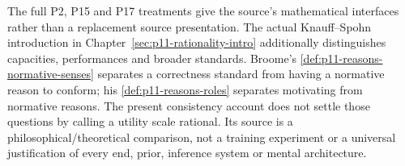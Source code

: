 The full P2, P15 and P17 treatments give the source's mathematical
interfaces rather than a replacement source presentation. The actual
Knauff--Spohn introduction in Chapter~\ref{sec:p11-rationality-intro}
additionally distinguishes capacities, performances and broader standards.
Broome's \ref{def:p11-reasons-normative-senses} separates a correctness
standard from having a normative reason to conform; his
\ref{def:p11-reasons-roles} separates motivating from normative reasons.
The present consistency account does not settle those questions by calling
a utility scale rational. Its source is a philosophical/theoretical
comparison, not a training experiment or a universal justification of
every end, prior, inference system or mental architecture.
